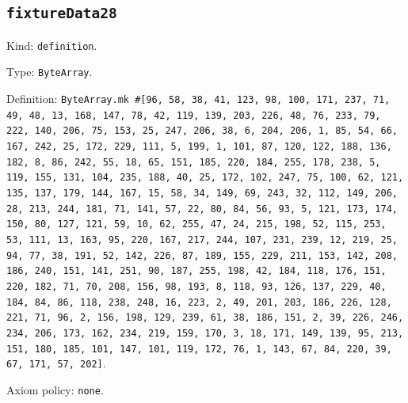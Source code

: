 \documentclass[11pt]{article}
\begin{document}
\subsection*{\texttt{fixtureData28}}
\noindent Kind: \texttt{definition}.\par
\noindent Type: \texttt{ByteArray}.\par
\noindent Definition: \texttt{ByteArray.mk \#[96, 58, 38, 41, 123, 98, 100, 171, 237, 71, 49, 48, 13, 168, 147, 78, 42, 119, 139, 203, 226, 48, 76, 233, 79, 222, 140, 206, 75, 153, 25, 247, 206, 38, 6, 204, 206, 1, 85, 54, 66, 167, 242, 25, 172, 229, 111, 5, 199, 1, 101, 87, 120, 122, 188, 136, 182, 8, 86, 242, 55, 18, 65, 151, 185, 220, 184, 255, 178, 238, 5, 119, 155, 131, 104, 235, 188, 40, 25, 172, 102, 247, 75, 100, 62, 121, 135, 137, 179, 144, 167, 15, 58, 34, 149, 69, 243, 32, 112, 149, 206, 28, 213, 244, 181, 71, 141, 57, 22, 80, 84, 56, 93, 5, 121, 173, 174, 150, 80, 127, 121, 59, 10, 62, 255, 47, 24, 215, 198, 52, 115, 253, 53, 111, 13, 163, 95, 220, 167, 217, 244, 107, 231, 239, 12, 219, 25, 94, 77, 38, 191, 52, 142, 226, 87, 189, 155, 229, 211, 153, 142, 208, 186, 240, 151, 141, 251, 90, 187, 255, 198, 42, 184, 118, 176, 151, 220, 182, 71, 70, 208, 156, 98, 193, 8, 118, 93, 126, 137, 229, 40, 184, 84, 86, 118, 238, 248, 16, 223, 2, 49, 201, 203, 186, 226, 128, 221, 71, 96, 2, 156, 198, 129, 239, 61, 38, 186, 151, 2, 39, 226, 246, 234, 206, 173, 162, 234, 219, 159, 170, 3, 18, 171, 149, 139, 95, 213, 151, 180, 185, 101, 147, 101, 119, 172, 76, 1, 143, 67, 84, 220, 39, 67, 171, 57, 202]}.\par
\noindent Axiom policy: \texttt{none}.\par
\end{document}
